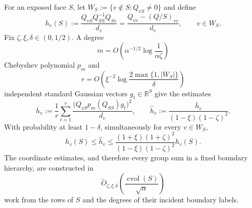 \begin{theorem}
\label{thm:static-diagonal-loss-checkpoint}
For an exposed face $S$, let
$W_S:=\{v\notin S:Q_{vS}\neq0\}$ and define
\begin{equation}
 h_v(S):=\frac{Q_{vS}Q_{SS}^{-1}Q_{Sv}}{d_v}
 =\frac{Q_{vv}-(Q/S)_{vv}}{d_v},
 \qquad v\in W_S.
 \label{eq:static-checkpoint-loss}
\end{equation}
Fix $\zeta,\xi,\delta\in(0,1/2)$.  A degree
\begin{equation*}
 m=O\!\left(\alpha^{-1/2}\log\frac1{\alpha\zeta}\right)
\end{equation*}
Chebyshev polynomial $p_m$ and
\begin{equation*}
 r=O\!\left(\xi^{-2}\log\frac{2\max\{1,|W_S|\}}{\delta}\right)
\end{equation*}
independent standard Gaussian vectors $g_t\in\mathbb R^S$ give the estimates
\begin{equation}
 \overline h_v:=\frac1r\sum_{t=1}^r
  \frac{\bigl(Q_{vS}p_m(Q_{SS})g_t\bigr)^2}{d_v},
 \qquad
 \widehat h_v:=\frac{\overline h_v}
 {(1-\xi)(1-\zeta)^2}.
 \label{eq:static-checkpoint-estimator}
\end{equation}
With probability at least $1-\delta$, simultaneously for every $v\in W_S$,
\begin{equation}
 h_v(S)\leq\widehat h_v
 \leq
 \frac{(1+\xi)(1+\zeta)^2}
 {(1-\xi)(1-\zeta)^2}h_v(S).
 \label{eq:static-checkpoint-guarantee}
\end{equation}
The coordinate estimates, and therefore every group sum in a fixed boundary
hierarchy, are constructed in
\begin{equation}
 \widetilde O_{\zeta,\xi,\delta}\!\left(
  \frac{\operatorname{cvol}(S)}{\sqrt\alpha}
 \right)
 \label{eq:static-checkpoint-work}
\end{equation}
work from the rows of $S$ and the degrees of their incident boundary labels.
\end{theorem}

